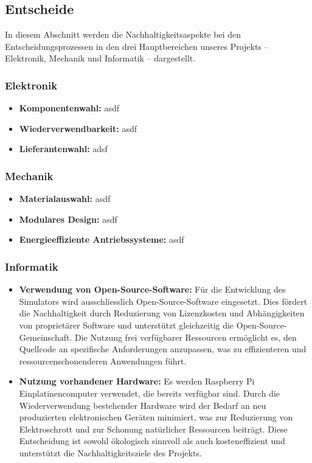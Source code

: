 \documentclass[../../main.tex]{subfiles} %
\begin{document}
\subsection{Entscheide}

In diesem Abschnitt werden die Nachhaltigkeitsaspekte bei den
Entscheidungsprozessen in den drei Hauptbereichen unseres Projekts –
Elektronik, Mechanik und Informatik – dargestellt.

\subsubsection{Elektronik}

\begin{itemize}
  \item \textbf{Komponentenwahl:} asdf
  \item \textbf{Wiederverwendbarkeit:} asdf
  \item \textbf{Lieferantenwahl:} adsf
\end{itemize}

\subsubsection{Mechanik}

\begin{itemize}
  \item \textbf{Materialauswahl:} asdf
  \item \textbf{Modulares Design:} asdf
  \item \textbf{Energieeffiziente Antriebssysteme:} asdf
\end{itemize}

\subsubsection{Informatik}

\begin{itemize}
  \item \textbf{Verwendung von Open-Source-Software:} Für die
    Entwicklung des Simulators wird ausschliesslich
    Open-Source-Software eingesetzt. Dies fördert die Nachhaltigkeit
    durch Reduzierung von Lizenzkosten und Abhängigkeiten von
    proprietärer Software und unterstützt gleichzeitig die
    Open-Source-Gemeinschaft. Die Nutzung frei verfügbarer Ressourcen
    ermöglicht es, den Quellcode an spezifische Anforderungen
    anzupassen, was zu effizienteren und ressourcenschonenderen
    Anwendungen führt.

  \item \textbf{Nutzung vorhandener Hardware:} Es werden Raspberry Pi
    Einplatinencomputer verwendet, die bereits verfügbar sind. Durch
    die Wiederverwendung bestehender Hardware wird der Bedarf an neu
    produzierten elektronischen Geräten minimiert, was zur
    Reduzierung von Elektroschrott und zur Schonung natürlicher
    Ressourcen beiträgt. Diese Entscheidung ist sowohl ökologisch
    sinnvoll als auch kosteneffizient und unterstützt die
    Nachhaltigkeitsziele des Projekts.
\end{itemize}
\end{document}
